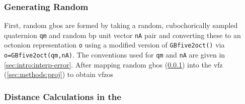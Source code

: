 \documentclass[preprint,12pt]{elsarticle}
\begin{document}

\subsubsection{Generating Random }
\label{sec:methods:rand}
First, random \glspl{gbo} are formed by taking a random, cubochorically sampled quaternion \cite{singhOrientationSamplingDictionarybased2016} \texttt{qm} and random \gls{bp} unit vector \texttt{nA} pair and converting these to an octonion representation \texttt{o} using a modified version \cite{bairdFiveDegreeofFreedom5DOF2020} of \texttt{GBfive2oct()} \cite{chesserGBOctonionCode2019} via \texttt{o=GBfive2oct(qm,nA)}. The conventions used for \texttt{qm} and \texttt{nA} are given in \cref{sec:intro:interp-error}. After mapping random \glspl{gbo} (\cref{sec:methods:rand}) into the \gls{vfz} (\cref{sec:methods:proj}) to obtain \glspl{vfzo} %

\subsubsection{Distance Calculations in the }
\label{sec:methods:vfz-dist}
\end{document}
